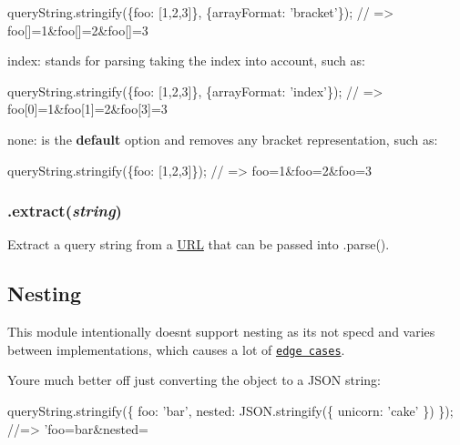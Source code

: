 \begin{DoxyCode}
queryString.stringify(\{foo: [1,2,3]\}, \{arrayFormat: 'bracket'\});
// => foo[]=1&foo[]=2&foo[]=3
\end{DoxyCode}



\begin{DoxyItemize}
\item {\ttfamily index}\+: stands for parsing taking the index into account, such as\+:
\end{DoxyItemize}


\begin{DoxyCode}
queryString.stringify(\{foo: [1,2,3]\}, \{arrayFormat: 'index'\});
// => foo[0]=1&foo[1]=2&foo[3]=3
\end{DoxyCode}



\begin{DoxyItemize}
\item {\ttfamily none}\+: is the {\bfseries default} option and removes any bracket representation, such as\+:
\end{DoxyItemize}


\begin{DoxyCode}
queryString.stringify(\{foo: [1,2,3]\});
// => foo=1&foo=2&foo=3
\end{DoxyCode}


\subsubsection*{.extract({\itshape string})}

Extract a query string from a \mbox{\hyperlink{namespace_u_r_l}{U\+RL}} that can be passed into {\ttfamily .parse()}.

\subsection*{Nesting}

This module intentionally doesn\textquotesingle{}t support nesting as it\textquotesingle{}s not spec\textquotesingle{}d and varies between implementations, which causes a lot of \href{https://github.com/visionmedia/node-querystring/issues}{\tt edge cases}.

You\textquotesingle{}re much better off just converting the object to a J\+S\+ON string\+:


\begin{DoxyCode}
queryString.stringify(\{
    foo: 'bar',
    nested: JSON.stringify(\{
        unicorn: 'cake'
    \})
\});
//=> 'foo=bar&nested=%
\end{DoxyCode}


